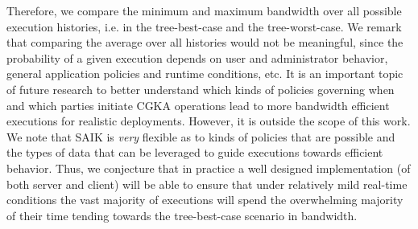 

Therefore, we compare the minimum and maximum bandwidth over all possible execution histories, i.e. in the
tree-best-case and the tree-worst-case.
We remark that comparing the average over all histories would not be meaningful, since the probability of a given execution depends on user and administrator behavior, general application policies and runtime conditions, etc.
It is an important topic of future research to
better understand which kinds of policies governing when and which parties
initiate CGKA operations lead to more bandwidth efficient executions for
realistic deployments. However, it is outside the scope of this work.
%
We note that SAIK is \emph{very} flexible as to kinds of policies that are possible and the types of data that can be leveraged to guide executions towards efficient behavior. Thus, we conjecture that in practice a well designed implementation (of both server and client) will be able to ensure that under relatively mild real-time conditions the vast majority of executions will spend the overwhelming majority of their time tending towards the tree-best-case scenario in bandwidth.


